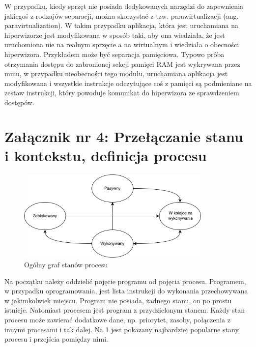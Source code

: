 \documentclass[../main]{subfiles}
\begin{document}
W przypadku, kiedy sprzęt nie posiada dedykowanych narzędzi do zapewnienia jakiegoś z rodzajów separacji, można skorzystać z tzw. parawirtualizacji (ang. paravirtualization). W takim przypadku aplikacja, która jest uruchamiana na hiperwizorze jest modyfikowana w sposób taki, aby ona wiedziała, że jest uruchomiona nie na realnym sprzęcie a na wirtualnym i wiedziała o obecności hiperwizora. Przykładem może być separacja pamięciowa. Typowo próba otrzymania dostępu do zabronionej sekcji pamięci RAM jest wykrywana przez \acrshort{mmu}, w przypadku nieobecności tego modułu, uruchamiana aplikacja jest modyfikowana i wszystkie instrukcje odczytujące coś z pamięci są podmieniane na zestaw instrukcji, który powoduje komunikat do hiperwizora ze sprawdzeniem dostępów.

\section*{Załącznik nr 4: Przełączanie stanu i kontekstu, definicja procesu}\label{sec:zalacznik-4}

\begin{figure}
    \centering
    \includegraphics[width=0.85\textwidth]{Images/process-states.png}
    \caption{Ogólny graf stanów procesu}
    \label{fig:process-states}
\end{figure}

Na początku należy oddzielić pojęcie programu od pojęcia procesu. Programem, w przypadku oprogramowania, jest lista instrukcji do wykonania przechowywana w jakimkolwiek miejscu. Program nie posiada, żadnego stanu, on po prostu istnieje. Natomiast procesem jest program z przydzielonym stanem. Każdy stan procesu może zawierać dodatkowe dane, np. priorytet, zasoby, połączenia z innymi procesami i tak dalej. Na \cref{fig:process-states} jest pokazany najbardziej popularne stany procesu i przejścia pomiędzy nimi.
\end{document}
